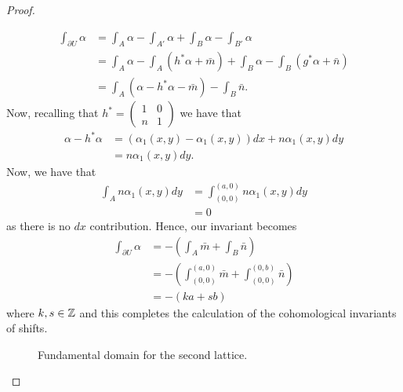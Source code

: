 \begin{proof}
\begin{case}[$\mathcal{B}_{n,a,b}$]
\begin{align*}
            \int_{\partial U} \alpha & = \int_A \alpha - \int_{A'} \alpha + \int_B \alpha - \int_{B'}\alpha                          \\
                                     & = \int_A \alpha - \int_A (h^*\alpha + \bar{m}) + \int_B \alpha - \int_B (g^*\alpha + \bar{n}) \\
                                     & = \int_A (\alpha - h^*\alpha - \bar{m}) - \int_B\bar{n}.
        \end{align*}
        Now, recalling that $h^* = \begin{pmatrix}
                1 & 0 \\
                n & 1
            \end{pmatrix}$ we have that
        \begin{align*}
            \alpha - h^*\alpha & = (\alpha_1(x,y) - \alpha_1(x,y))dx + n\alpha_1(x,y)dy \\
                               & = n\alpha_1(x,y)dy.
        \end{align*}
        Now, we have that
        \begin{align*}
            \int_A n\alpha_1(x,y)dy & = \int_{(0,0)}^{(a,0)} n\alpha_1(x,y)dy \\
                                    & =0
        \end{align*}
        as there is no $dx$ contribution. Hence, our invariant becomes
        \begin{align*}
            \int_{\partial U} \alpha & = -\left(\int_A \bar{m} + \int_B \bar{n}\right)                            \\
                                     & =-\left(\int_{(0,0)}^{(a,0)} \bar{m} + \int_{(0,0)}^{(0,b)} \bar{n}\right) \\
                                     & = -(ka + sb)
        \end{align*}
        where $k, s \in \mathbb{Z}$ and this completes the calculation of the cohomological invariants of shifts.
    \end{case}

    \begin{figure}[H]
        \centering
        \caption{Fundamental domain for the second lattice.}
        \label{fig:second-lattice}
    \end{figure}
\end{proof}

